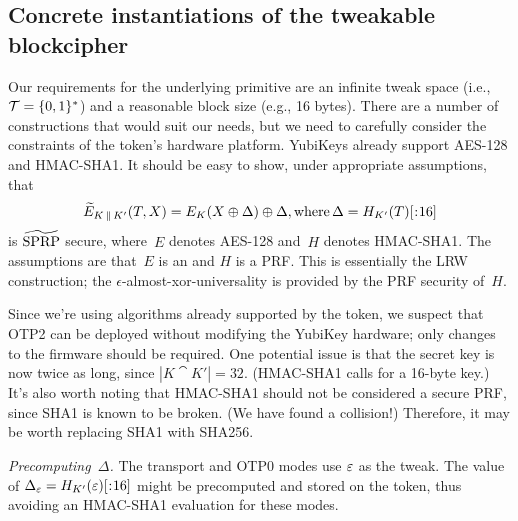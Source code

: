 \subsection{Concrete instantiations of the tweakable blockcipher}

Our requirements for the underlying primitive are an infinite tweak space (i.e.,
$\mathcal{T}=\{0,1\}^*$) and a reasonable block size (e.g., 16 bytes). There are a
number of constructions that would suit our needs, but we need to carefully
consider the constraints of the token's hardware platform. YubiKeys already
support AES-128 and HMAC-SHA1. It should be easy to show, under appropriate
assumptions, that
\[
  \widetilde{E}_{K\cat K'}(T, X) = E_K(X \xor \Delta) \xor \Delta,
  \text{where}\, \Delta = \substr({H_{K'}(T)},,16)
\]
is $\widetilde{\textnormal{SPRP}}$ secure, where~$E$ denotes AES-128 and~$H$ denotes HMAC-SHA1. The
assumptions are that~$E$ is an \sprp and $H$ is a PRF. This is essentially the
LRW construction; the $\epsilon$-almost-xor-universality is provided by the PRF
security of~$H$.

Since we're using algorithms already supported by the token, we suspect that
OTP2 can be deployed without modifying the YubiKey hardware; only changes to the
firmware should be required. One potential issue is that the secret key is now
twice as long, since $|K \cat K'| = 32$. (HMAC-SHA1 calls for a
16-byte key.)
%
%
It's also worth noting that HMAC-SHA1 should not be considered a secure
PRF, since SHA1 is known to be broken. (We have found a collision!) Therefore,
it may be worth replacing SHA1 with SHA256.

\textit{Precomputing~$\Delta$.}
%
The transport and OTP0 modes use $\varepsilon$ as the tweak. The value of
$\Delta_\emptystr = \substr({H_{K'}(\emptystr)},,16)$ might be precomputed and
stored on the token, thus avoiding an HMAC-SHA1 evaluation for these modes.
